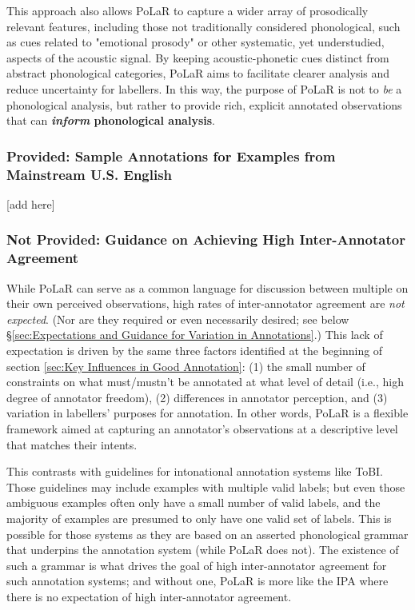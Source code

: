 \documentclass[11pt, twoside]{memoir}
\begin{document}
This approach also allows PoLaR to capture a wider array of prosodically relevant features, including those not traditionally considered phonological, such as cues related to "emotional prosody" or other systematic, yet understudied, aspects of the acoustic signal. By keeping acoustic-phonetic cues distinct from abstract phonological categories, PoLaR aims to facilitate clearer analysis and reduce uncertainty for labellers. In this way, the purpose of PoLaR is not to \textit{be} a phonological analysis, but rather to provide rich, explicit annotated observations that can \textbf{\textit{inform} phonological analysis}. 

\subsubsection{Provided: Sample Annotations for Examples from Mainstream U.S. English}

[add here]

\subsubsection{Not Provided: Guidance on Achieving High Inter-Annotator Agreement}

While PoLaR can serve as a common language for discussion between multiple on their own perceived observations, high rates of inter-annotator agreement are \textit{not expected}. (Nor are they required or even necessarily desired; see below §\ref{sec:Expectations and Guidance for Variation in Annotations}.) This lack of expectation is driven by the same three factors identified at the beginning of section \ref{sec:Key Influences in Good Annotation}: (1) the small number of constraints on what must{\slash}mustn't be annotated at what level of detail (i.e., high degree of annotator freedom), (2) differences in annotator perception, and (3) variation in labellers' purposes for annotation. In other words, PoLaR is a flexible framework aimed at capturing an annotator's observations at a descriptive level that matches their intents.

This contrasts with guidelines for intonational annotation systems like ToBI. Those guidelines may include examples with multiple valid labels; but even those ambiguous examples often only have a small number of valid labels, and the majority of examples are presumed to only have one valid set of labels. This is possible for those systems as they are based on an asserted phonological grammar that underpins the annotation system (while PoLaR does not). The existence of such a grammar is what drives the goal of high inter-annotator agreement for such annotation systems; and without one, PoLaR is more like the IPA where there is no expectation of high inter-annotator agreement.
\end{document}
